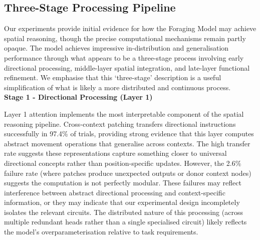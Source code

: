 
\subsection{Three-Stage Processing Pipeline}

Our experiments provide initial evidence for how the Foraging Model may achieve spatial reasoning, though the precise computational mechanisms remain partly opaque. The model achieves impressive in-distribution and generalisation performance through what appears to be a three-stage process involving early directional processing, middle-layer spatial integration, and late-layer functional refinement. We emphasise that this `three-stage' description is a useful simplification of what is likely a more distributed and continuous process.\\

\textbf{Stage 1 - Directional Processing (Layer 1)}

Layer 1 attention implements the most interpretable component of the spatial reasoning pipeline. Cross-context patching transfers directional instructions successfully in 97.4\% of trials, providing strong evidence that this layer computes abstract movement operations that generalise across contexts. The high transfer rate suggests these representations capture something closer to universal directional concepts rather than position-specific updates. However, the 2.6\% failure rate (where patches produce unexpected outputs or donor context nodes) suggests the computation is not perfectly modular. These failures may reflect interference between abstract directional processing and context-specific information, or they may indicate that our experimental design incompletely isolates the relevant circuits. The distributed nature of this processing (across multiple redundant heads rather than a single specialised circuit) likely reflects the model's overparameterisation relative to task requirements.\\

